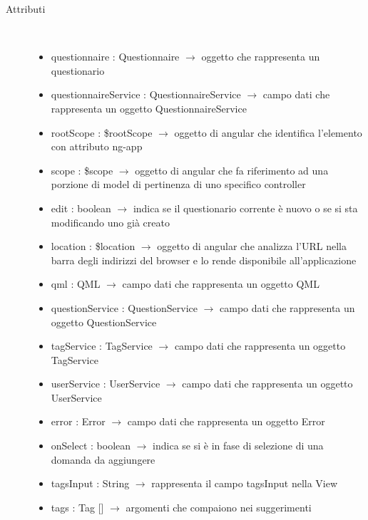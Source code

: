 \begin{description}
\item[Attributi] \hfill \\
\vspace{-7mm}
\begin{itemize}
	\item questionnaire : Questionnaire $\rightarrow$ oggetto che rappresenta un questionario
	\item questionnaireService : QuestionnaireService $\rightarrow$ campo dati che rappresenta un oggetto QuestionnaireService
	\item rootScope : \$rootScope $\rightarrow$ oggetto di angular che identifica l’elemento con attributo ng-app
	\item scope : \$scope $\rightarrow$ oggetto di angular che fa riferimento ad una porzione di model di pertinenza di uno specifico controller
	\item edit : boolean $\rightarrow$ indica se il questionario corrente è nuovo o se si sta modificando uno già creato
	\item location : \$location $\rightarrow$ oggetto di angular che analizza l'URL nella barra degli indirizzi del browser e lo rende disponibile all'applicazione
	\item qml : QML $\rightarrow$ campo dati che rappresenta un oggetto QML
	\item questionService : QuestionService $\rightarrow$ campo dati che rappresenta un oggetto QuestionService
	\item tagService : TagService $\rightarrow$ campo dati che rappresenta un oggetto TagService
	\item userService : UserService $\rightarrow$ campo dati che rappresenta un oggetto UserService
	\item error : Error $\rightarrow$ campo dati che rappresenta un oggetto Error
	\item onSelect : boolean $\rightarrow$ indica se si è in fase di selezione di una domanda da aggiungere
	\item tagsInput : String $\rightarrow$ rappresenta il campo tagsInput nella View
	\item tags : Tag [] $\rightarrow$ argomenti che compaiono nei suggerimenti
\end{itemize}


\end{description}
